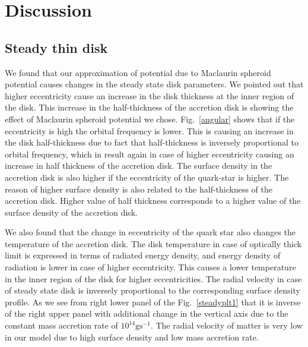 \documentclass[useAMS,usenatbib]{mn2e}
\begin{document}
\section{Discussion}
\subsection{Steady thin disk}
We found that our approximation of potential due to Maclaurin spheroid potential causes changes in the steady state disk parameters. We pointed out that higher eccentricity cause an increase in the disk thickness at the inner region of the disk. This increase in the half-thickness of the accretion disk is showing the effect of Maclaurin spheroid potential we chose. Fig.~\ref{angular} shows that if the eccentricity is high the orbital frequency is lower. This is causing an increase in the disk half-thickness due to fact that half-thickness is inversely proportional to orbital frequency, which in result again in case of higher eccentricity causing an increase in half thickness of the accretion disk. The surface density in the accretion disk is also higher if the eccentricity of the quark-star is higher. The reason of higher surface density is also related to the half-thickness of the accretion disk. Higher value of half thickness corresponds to a higher value of the surface density of the accretion disk. 

We also found that the change in eccentricity of the quark star also changes the temperature of the accretion disk. The disk temperature in case of optically thick limit is expressed in terms of radiated energy density, and energy density of radiation is lower in case of higher eccentricity. This causes a lower temperature in the inner region of the disk for higher eccentricities. The radial velocity in case of steady state disk is inversely proportional to the corresponding surface density profile. As we see from right lower panel of the Fig.~\ref{steadyplt1} that it is inverse of the right upper panel with additional change in the vertical axis due to the constant mass accretion rate of $10^{14} \textrm{g}\textrm{s}^{-1}$. The radial velocity of matter is very low in our model due to high surface density and low mass accretion rate. 
\end{document}
